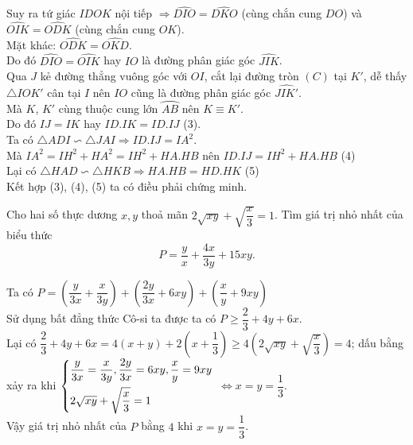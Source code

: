 {\begin{enumerate}[1)]
Suy ra tứ giác $IDOK$ nội tiếp $\Rightarrow \widehat{DIO}=\widehat{DKO}$ (cùng chắn cung $DO$) và $\widehat{OIK}=\widehat{ODK}$ (cùng chắn cung $OK$).\\
Mặt khác: $\widehat{ODK}=\widehat{OKD}$.\\
Do đó $\widehat{DIO}=\widehat{OIK}$ hay $IO$ là đường phân giác góc $\widehat{JIK}$.\\
Qua $J$ kẻ đường thẳng vuông góc với $OI$, cắt lại đường tròn $(C)$ tại $K'$, dễ thấy $\triangle  IOK'$ cân tại $I$ nên $IO$ cũng là đường phân giác góc $\widehat{JIK'}$.\\
 Mà $K$, $K'$ cùng thuộc cung lớn $\wideparen{AB}$ nên $K\equiv K'$.\\
 Do đó $ IJ= IK$ hay $ID. IK=ID. IJ$ (3). \\
Ta có $\triangle  ADI\backsim \triangle  JAI\Rightarrow ID. IJ=IA^2$.\\
 Mà $IA^2=IH^2 + HA^2=IH^2 + HA. HB$ nên $ID. IJ=IH^2 + HA. HB$ (4)	\\
Lại có $\triangle  HAD\backsim \triangle  HKB\Rightarrow HA. HB=HD. HK$ (5)\\
Kết hợp (3), (4), (5) ta có điều phải chứng minh. 	

\end{enumerate}
}
\begin{ex}%
Cho hai số thực dương $x, y$ thoả mãn $2\sqrt{xy} + \sqrt{\dfrac{x}{3}}=1$. Tìm giá trị nhỏ nhất của biểu thức 
$$P=\dfrac{y}{x} + \dfrac{4x}{3y} + 15xy.$$
\end{ex}
\loigiai
{
Ta có $P=\left(\dfrac{y}{3x} + \dfrac{x}{3y}\right) + \left(\dfrac{2y}{3x} + 6xy\right) + \left(\dfrac{x}{y} + 9xy\right)$\\
Sử dụng bất đẳng thức Cô-si ta được ta có $P\ge \dfrac{2}{3} + 4y + 6x$.\\
Lại có $\dfrac{2}{3} + 4y + 6x=4(x + y) + 2\left(x + \dfrac{1}{3}\right)\ge 4\left(2\sqrt{xy} + \sqrt{\dfrac{x}{3}}\right)=4$; dấu bằng xảy ra khi  $\left\{\begin{aligned} & \dfrac{y}{3x}=\dfrac{x}{3y}, \dfrac{2y}{3x}=6xy, \dfrac{x}{y}=9xy \\   & 2\sqrt{xy} + \sqrt{\dfrac{x}{3}}=1\end{aligned}\right.$ $\Leftrightarrow x=y=\dfrac{1}{3}$.\\
Vậy giá trị nhỏ nhất của $P$ bằng $4$ khi $x=y=\dfrac{1}{3}$. 

}


